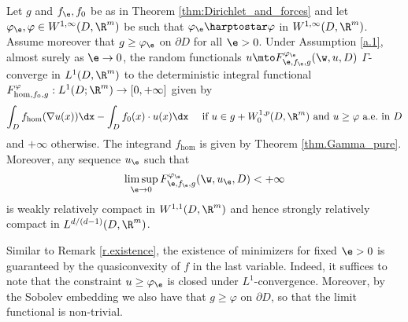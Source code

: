 \begin{theorem}\label{thm.obstacle}
Let $g$ and $f_{\e},f_0$ be as in Theorem \ref{thm:Dirichlet_and_forces} and let $\varphi_{\e},\varphi\in W^{1,\infty}(D,\R^m)$ be such that $\varphi_{\e}\harptostar\varphi$ in $W^{1,\infty}(D,\R^m)$. Assume moreover that $g\geq\varphi_{\e}$ on $\partial D$ for all $\e>0$. Under Assumption \ref{a.1}, almost surely as $\e\to 0$, the random functionals $u\mto F^{\varphi_{\e}}_{\e,f_{\e},g}(\w,u,D)$ $\Gamma$-converge in $L^1(D,\R^m)$ to the deterministic integral functional $F^{\varphi}_{\hom,f_0,g}:L^1(D;\R^m)\to [0,+\infty]$ given by
\begin{equation*}
\int_D f_{\hom}(\nabla u(x))\dx-\int_Df_0(x)\cdot u(x)\dx \quad\text{ if }u\in g+W^{1,p}_0(D,\R^m)\text{ and }u\geq\varphi\text{ a.e.\ in }D
\end{equation*}
and $+\infty$ otherwise. The integrand $f_{\hom}$ is given by Theorem \ref{thm.Gamma_pure}. Moreover, any sequence $u_{\e}$ such that
\begin{equation*}
\limsup_{\e\to 0}F^{\varphi_{\e}}_{\e,f_{\e},g}(\w,u_{\e},D)<+\infty
\end{equation*}
is weakly relatively compact in $W^{1,1}(D,\R^m)$ and hence strongly relatively compact in $L^{d/(d-1)}(D,\R^m)$.
\end{theorem}
\begin{remark}
Similar to Remark \ref{r.existence}, the existence of minimizers for fixed $\e>0$ is guaranteed by the quasiconvexity of $f$ in the last variable. Indeed, it suffices to note that the constraint $u\geq\varphi_{\e}$ is closed under $L^1$-convergence. Moreover, by the Sobolev embedding we also have that $g\geq \varphi$ on $\partial D$, so that the limit functional is non-trivial.
\end{remark}

